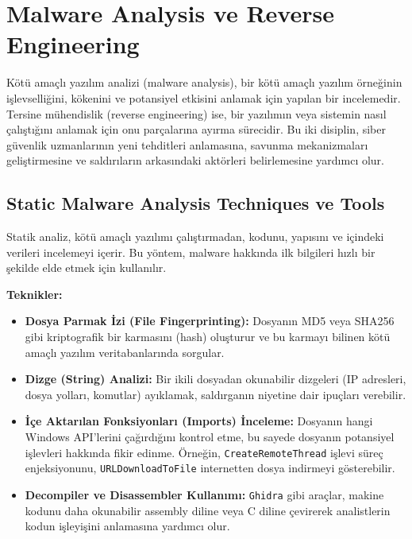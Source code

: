 \section{Malware Analysis ve Reverse Engineering}

Kötü amaçlı yazılım analizi (malware analysis), bir kötü amaçlı yazılım örneğinin işlevselliğini, kökenini ve potansiyel etkisini anlamak için yapılan bir incelemedir. Tersine mühendislik (reverse engineering) ise, bir yazılımın veya sistemin nasıl çalıştığını anlamak için onu parçalarına ayırma sürecidir. Bu iki disiplin, siber güvenlik uzmanlarının yeni tehditleri anlamasına, savunma mekanizmaları geliştirmesine ve saldırıların arkasındaki aktörleri belirlemesine yardımcı olur.

\subsection{Static Malware Analysis Techniques ve Tools}

Statik analiz, kötü amaçlı yazılımı çalıştırmadan, kodunu, yapısını ve içindeki verileri incelemeyi içerir. Bu yöntem, malware hakkında ilk bilgileri hızlı bir şekilde elde etmek için kullanılır.

\textbf{Teknikler:}
\begin{itemize}
    \item \textbf{Dosya Parmak İzi (File Fingerprinting):} Dosyanın MD5 veya SHA256 gibi kriptografik bir karmasını (hash) oluşturur ve bu karmayı bilinen kötü amaçlı yazılım veritabanlarında sorgular.
    \item \textbf{Dizge (String) Analizi:} Bir ikili dosyadan okunabilir dizgeleri (IP adresleri, dosya yolları, komutlar) ayıklamak, saldırganın niyetine dair ipuçları verebilir.
    \item \textbf{İçe Aktarılan Fonksiyonları (Imports) İnceleme:} Dosyanın hangi Windows API'lerini çağırdığını kontrol etme, bu sayede dosyanın potansiyel işlevleri hakkında fikir edinme. Örneğin, \texttt{CreateRemoteThread} işlevi süreç enjeksiyonunu, \texttt{URLDownloadToFile} internetten dosya indirmeyi gösterebilir.
    \item \textbf{Decompiler ve Disassembler Kullanımı:} \texttt{Ghidra} gibi araçlar, makine kodunu daha okunabilir assembly diline veya C diline çevirerek analistlerin kodun işleyişini anlamasına yardımcı olur.
\end{itemize}

